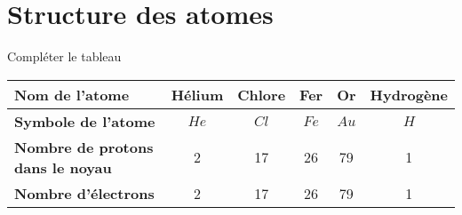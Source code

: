 \section{Structure des atomes}

\begin{questions}
	\question[4] Compléter le tableau \\
	

	\begin{solution}
		\noindent\begin{tabular}{|@{\ }l@{\ }|@{\ }c@{\ }|@{\ }c@{\ }|@{\ }c@{\ }|@{\ }c@{\ }|@{\ }c@{\ }|}
			\hline
			\textbf{Nom de l'atome}                  &  Hélium     & Chlore &  Fer  & Or  & Hydrogène    \\ \hline
			\textbf{Symbole de l'atome}              & $He$ &   $Cl$     & $Fe$   & $Au$   & $H$ \\ \hline
			\textbf{Nombre de protons dans le noyau} &   2   &  17    & 26 &  79  &  1   \\ \hline
			\textbf{Nombre d'électrons}              &   2   &  17    & 26 &  79  &  1   \\ \hline
		\end{tabular}
	\end{solution}
\end{questions}
